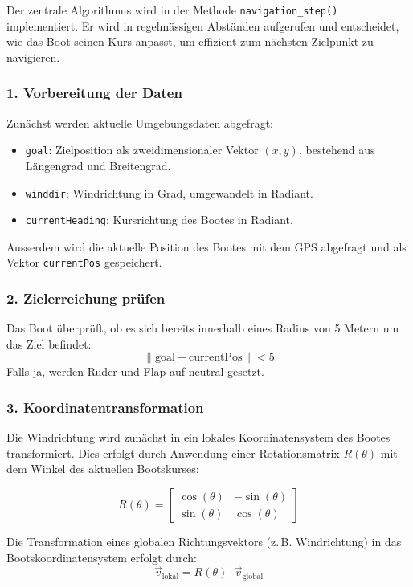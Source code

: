Der zentrale Algorithmus wird in der Methode \texttt{navigation\_step()} implementiert. Er wird in regelmässigen Abständen aufgerufen und entscheidet, wie das Boot seinen Kurs anpasst, um effizient zum nächsten Zielpunkt zu navigieren.

\subsubsection*{1. Vorbereitung der Daten}

Zunächst werden aktuelle Umgebungsdaten abgefragt:

\begin{itemize}
    \item \texttt{goal}: Zielposition als zweidimensionaler Vektor $(x, y)$, bestehend aus Längengrad und Breitengrad.
    \item \texttt{winddir}: Windrichtung in Grad, umgewandelt in Radiant.
    \item \texttt{currentHeading}: Kursrichtung des Bootes in Radiant.
\end{itemize}

Ausserdem wird die aktuelle Position des Bootes mit dem GPS abgefragt und als Vektor \texttt{currentPos} gespeichert.

\subsubsection*{2. Zielerreichung prüfen}

Das Boot überprüft, ob es sich bereits innerhalb eines Radius von 5 Metern um das Ziel befindet:
\[
\|\text{goal} - \text{currentPos}\| < 5
\]
Falls ja, werden Ruder und Flap auf neutral gesetzt.

\subsubsection*{3. Koordinatentransformation}

Die Windrichtung wird zunächst in ein lokales Koordinatensystem des Bootes transformiert. Dies erfolgt durch Anwendung einer Rotationsmatrix $R(\theta)$ mit dem Winkel des aktuellen Bootskurses:

\[
R(\theta) = 
\begin{bmatrix}
\cos(\theta) & -\sin(\theta) \\
\sin(\theta) & \cos(\theta)
\end{bmatrix}
\]

Die Transformation eines globalen Richtungsvektors (z. B. Windrichtung) in das Bootskoordinatensystem erfolgt durch:
\[
\vec{v}_{\text{lokal}} = R(\theta) \cdot \vec{v}_{\text{global}}
\]

